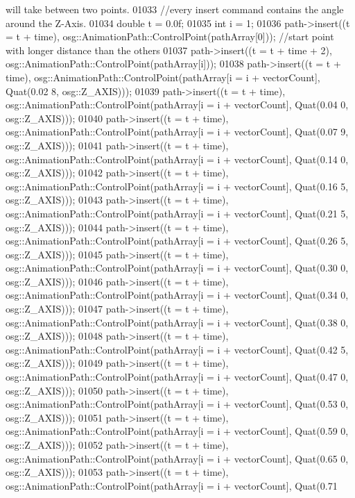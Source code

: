 \begin{DoxyCode}
{       will take between two points.}
01033     \textcolor{comment}{//every insert command contains the angle around the Z-Axis.}
01034     \textcolor{keywordtype}{double} t = 0.0f;
01035     \textcolor{keywordtype}{int} i = 1;
01036     path->insert((t = t + time), osg::AnimationPath::ControlPoint(pathArray[0])); \textcolor{comment}{//start point with longer
       distance than the others}
01037     path->insert((t = t + time + 2), osg::AnimationPath::ControlPoint(pathArray[i]));
01038     path->insert((t = t + time), osg::AnimationPath::ControlPoint(pathArray[i = i + vectorCount], Quat(0.02
      8, osg::Z\_AXIS)));
01039     path->insert((t = t + time), osg::AnimationPath::ControlPoint(pathArray[i = i + vectorCount], Quat(0.04
      0, osg::Z\_AXIS)));
01040     path->insert((t = t + time), osg::AnimationPath::ControlPoint(pathArray[i = i + vectorCount], Quat(0.07
      9, osg::Z\_AXIS)));
01041     path->insert((t = t + time), osg::AnimationPath::ControlPoint(pathArray[i = i + vectorCount], Quat(0.14
      0, osg::Z\_AXIS)));
01042     path->insert((t = t + time), osg::AnimationPath::ControlPoint(pathArray[i = i + vectorCount], Quat(0.16
      5, osg::Z\_AXIS)));
01043     path->insert((t = t + time), osg::AnimationPath::ControlPoint(pathArray[i = i + vectorCount], Quat(0.21
      5, osg::Z\_AXIS)));
01044     path->insert((t = t + time), osg::AnimationPath::ControlPoint(pathArray[i = i + vectorCount], Quat(0.26
      5, osg::Z\_AXIS)));
01045     path->insert((t = t + time), osg::AnimationPath::ControlPoint(pathArray[i = i + vectorCount], Quat(0.30
      0, osg::Z\_AXIS)));
01046     path->insert((t = t + time), osg::AnimationPath::ControlPoint(pathArray[i = i + vectorCount], Quat(0.34
      0, osg::Z\_AXIS)));
01047     path->insert((t = t + time), osg::AnimationPath::ControlPoint(pathArray[i = i + vectorCount], Quat(0.38
      0, osg::Z\_AXIS)));
01048     path->insert((t = t + time), osg::AnimationPath::ControlPoint(pathArray[i = i + vectorCount], Quat(0.42
      5, osg::Z\_AXIS)));
01049     path->insert((t = t + time), osg::AnimationPath::ControlPoint(pathArray[i = i + vectorCount], Quat(0.47
      0, osg::Z\_AXIS)));
01050     path->insert((t = t + time), osg::AnimationPath::ControlPoint(pathArray[i = i + vectorCount], Quat(0.53
      0, osg::Z\_AXIS)));
01051     path->insert((t = t + time), osg::AnimationPath::ControlPoint(pathArray[i = i + vectorCount], Quat(0.59
      0, osg::Z\_AXIS)));
01052     path->insert((t = t + time), osg::AnimationPath::ControlPoint(pathArray[i = i + vectorCount], Quat(0.65
      0, osg::Z\_AXIS)));
01053     path->insert((t = t + time), osg::AnimationPath::ControlPoint(pathArray[i = i + vectorCount], Quat(0.71

\end{DoxyCode}
